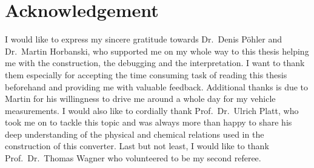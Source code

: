 \section{Acknowledgement}
\label{sec:acknowledgement}

I would like to express my sincere gratitude towards Dr.\ Denis Pöhler
and Dr.\ Martin Horbanski, who supported me on my whole way to this
thesis helping me with the construction, the debugging and the
interpretation. I want to thank them especially for accepting the time
consuming task of reading this thesis beforehand and providing me with
valuable feedback. Additional thanks is due to Martin for his
willingness to drive me around a whole day for my vehicle
measurements. I would also like to cordially thank Prof.\ Dr.\ Ulrich
Platt, who took me on to tackle this topic and was always more than
happy to share his deep understanding of the physical and chemical
relations used in the construction of this converter. Last but not
least, I would like to thank Prof.\ Dr.\ Thomas Wagner who volunteered
to be my second referee.

